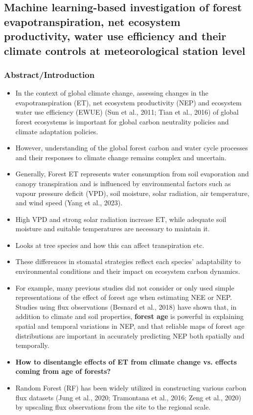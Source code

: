 \documentclass[paper=a4, fontsize=12pt]{scrartcl}
\begin{document}
	\newpage
	\subsection{Machine learning-based investigation of forest evapotranspiration, net ecosystem productivity, water use efficiency and their climate controls at meteorological station level \citep{shi2024machine}}
	
	\subsubsection{Abstract/Introduction}
	\begin{itemize}
		\item In the context of global climate change, assessing changes in the evapotranspiration (ET), net ecosystem productivity (NEP) and ecosystem water use efficiency (EWUE) (Sun et al., 2011; Tian et al., 2016) of global forest ecosystems is important for global carbon neutrality policies and climate adaptation policies.
		\item However, understanding of the global forest carbon and water cycle processes and their  responses to climate change remains complex and uncertain.
		\item Generally, Forest ET represents water consumption from soil evaporation and canopy transpiration and is influenced by environmental factors such as vapour pressure deficit (VPD), soil moisture, solar radiation, air temperature, and wind speed (Yang et al., 2023).
		\item High VPD and strong solar radiation increase ET, while adequate soil moisture and suitable temperatures are necessary to maintain it.
		\item Looks at tree species and how this can affect transpiration etc.
		\item These differences in stomatal strategies reflect each species’ adaptability to environmental conditions and their impact on ecosystem carbon dynamics.
		\item For example, many previous studies did not consider or only used simple representations of the effect of forest age when estimating NEE or NEP. Studies using flux observations (Besnard et al., 2018) have shown that, in addition to climate and soil properties, \textbf{forest age} is powerful in explaining spatial and temporal variations in NEP, and that reliable maps of forest age distributions are important in accurately predicting NEP both spatially and temporally.
		\item \textbf{How to disentangle effects of ET from climate change vs. effects coming from age of forests?}
		\item Random Forest (RF) has been widely utilized in constructing various carbon flux datasets (Jung et al., 2020; Tramontana et al., 2016; Zeng et al., 2020) by upscaling flux observations from the site to the regional scale.
	\end{itemize}
	
\end{document}
